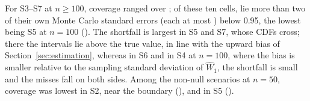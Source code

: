 \documentclass[AMA,Times1COL]{WileyNJDv5}
\begin{document}
For S3--S7 at $n \geq 100$, coverage ranged over ; of these ten cells,  lie more than two of their own Monte Carlo standard errors (each at most ) below 0.95, the lowest being S5 at $n = 100$ (). The shortfall is largest in S5 and S7, whose CDFs cross; there the intervals lie above the true value, in line with the upward bias of Section~\ref{sec:estimation}, whereas in S6 and in S4 at $n = 100$, where the bias is smaller relative to the sampling standard deviation of $\widehat{W}_1$, the shortfall is small and the misses fall on both sides. Among the non-null scenarios at $n = 50$, coverage was lowest in S2, near the boundary (), and in S5 ().%
\end{document}
